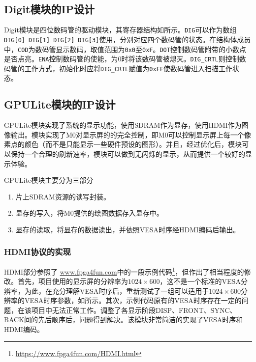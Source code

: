 

\subsection{Digit模块的IP设计}
Digit模块是四位数码管的驱动模块，其寄存器结构如所示。\texttt{DIG}可以作为数组\texttt{DIG[0] DIG[1] DIG[2] DIG[3]}使用，分别对应四个数码管的状态。在结构体成员中，\texttt{COD}为数码管显示数码，取值范围为\texttt{0x0}至\texttt{0xF}。\texttt{DOT}控制数码管附带的小数点是否点亮。\texttt{ENA}控制数码管的使能，为$0$时将该数码管被熄灭。\texttt{DIG\_CRTL}则控制数码管的工作方式，初始化时应将\texttt{DIG\_CRTL}赋值为\texttt{0xFF}使数码管进入扫描工作状态。



\subsection{GPULite模块的IP设计}
GPULite模块实现了系统的显示功能，使用SDRAM作为显存，使用HDMI作为图像输出。模块实现了M0对显示屏的的完全控制，即M0可以控制显示屏上每一个像素点的颜色（而不是只能显示一些硬件预设的图形）。并且，经过优化后，模块可以保持一个合理的刷新速率，模块可以做到无闪烁的显示，从而提供一个较好的显示体验。

GPULite模块主要分为三部分
\begin{enumerate}
    \item 片上SDRAM资源的读写封装。
    \item 显存的写入，将M0提供的绘图数据存入显存中。
    \item 显存的读取，将显存的数据读出，并依照VESA时序经HDMI编码后输出。
\end{enumerate}

\subsubsection{HDMI协议的实现}
HDMI部分参照了 \url{www.fpga4fun.com}中的一段示例代码\footnote{\url{https://www.fpga4fun.com/HDMI.html}}，但作出了相当程度的修改。首先，项目使用的显示屏的分辨率为$1024\times 600$，这不是一个标准的VESA分辨率，为此，在充分理解VESA时序后，重新测试了一组可以适用于$1024\times 600$分辨率的VESA时序参数，如所示。其次，示例代码原有的VESA时序存在一定的问题，在该项目中无法正常工作。调整了各显示阶段DISP、FRONT、SYNC、BACK间的先后顺序后，问题得到解决。该模块非常简洁的实现了VESA时序和HDMI编码。

